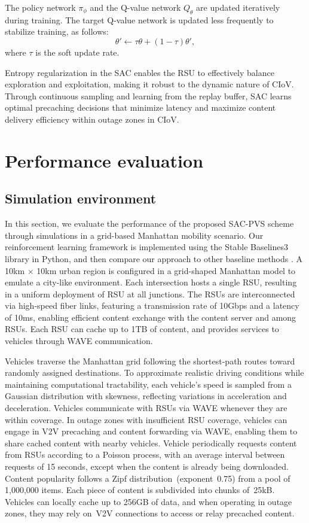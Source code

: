 \documentclass{aims}
\numberwithin{equation}{section}
\begin{document}
The policy network $\pi_{\phi}$ and the Q-value network $Q_{\theta}$ are updated iteratively during training.
The target Q-value network is updated less frequently to stabilize training, as follows:
\begin{equation}
    \theta' \leftarrow \tau \theta + (1 - \tau) \theta',
\end{equation}
where $\tau$ is the soft update rate.

Entropy regularization in the SAC enables the RSU to effectively balance exploration and exploitation, making it robust to the dynamic nature of CIoV.
Through continuous sampling and learning from the replay buffer, SAC learns optimal precaching decisions that minimize latency and maximize content delivery efficiency within outage zones in CIoV.


\section{Performance evaluation} \label{sec.perf}

\subsection{Simulation environment} \label{sec.s1}
In this section, we evaluate the performance of the proposed SAC-PVS scheme through simulations in a grid-based Manhattan mobility scenario.
Our reinforcement learning framework is implemented using the Stable Baselines3 library in Python, and then compare our approach to other baseline methods \cite{SB3}.
A 10km $\times$ 10km urban region is configured in a grid-shaped Manhattan model to emulate a city-like environment.
Each intersection hosts a single RSU, resulting in a uniform deployment of RSU at all junctions.
The RSUs are interconnected via high-speed fiber links, featuring a transmission rate of 10Gbps and a latency of 10ms, enabling efficient content exchange with the content server and among RSUs.
Each RSU can cache up to 1TB of content, and provides services to vehicles through WAVE communication.

Vehicles traverse the Manhattan grid following the shortest-path routes toward randomly assigned destinations.
To approximate realistic driving conditions while maintaining computational tractability, each vehicle’s speed is sampled from a Gaussian distribution with skewness, reflecting variations in acceleration and deceleration.
Vehicles communicate with RSUs via WAVE whenever they are within coverage.
In outage zones with insufficient RSU coverage, vehicles can engage in V2V precaching and content forwarding via WAVE, enabling them to share cached content with nearby vehicles.
Vehicle periodically requests content from RSUs according to a Poisson process, with an average interval between requests of 15 seconds, except when the content is already being downloaded.
Content popularity follows a Zipf distribution~(exponent~0.75) from a pool of 1,000,000 items. Each piece of content is subdivided into chunks of~25kB.
Vehicles can locally cache up to 256GB of data, and when operating in outage zones, they may rely on~V2V connections to access or relay precached content.
\end{document}
